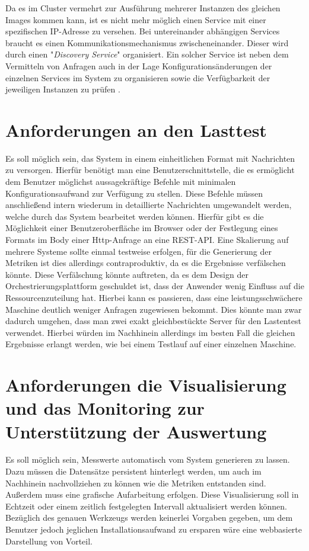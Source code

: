 Da es im Cluster vermehrt zur Ausführung mehrerer Instanzen des gleichen Images kommen kann, ist es nicht mehr möglich einen Service mit einer spezifischen IP-Adresse zu versehen. Bei untereinander abhängigen Services braucht es einen Kommunikationsmechanismus zwischeneinander. Dieser wird durch einen "\emph{Discovery Service}" organisiert. Ein solcher Service ist neben dem Vermitteln von Anfragen auch in der Lage Konfigurationsänderungen der einzelnen Services im System zu organisieren sowie die Verfügbarkeit der jeweiligen Instanzen zu prüfen \cite[Seite~45 ff.]{soppelsaswarm}.

\section{Anforderungen an den Lasttest}
Es soll möglich sein, das System in einem einheitlichen Format mit Nachrichten zu versorgen. Hierfür benötigt man eine Benutzerschnittstelle, die es ermöglicht dem Benutzer möglichst aussagekräftige Befehle mit minimalen Konfigurationsaufwand zur Verfügung zu stellen. Diese Befehle müssen anschließend intern wiederum in detaillierte Nachrichten umgewandelt werden, welche durch das System bearbeitet werden können. Hierfür gibt es die Möglichkeit einer Benutzeroberfläche im Browser oder der Festlegung eines Formats im Body einer Http-Anfrage an eine REST-API. Eine Skalierung auf mehrere Systeme sollte einmal testweise erfolgen, für die Generierung der Metriken ist dies allerdings contraproduktiv, da es die Ergebnisse verfälschen könnte. Diese Verfälschung könnte auftreten, da es dem Design der Orchestrierungsplattform geschuldet ist, dass der Anwender wenig Einfluss auf die Ressourcenzuteilung hat. Hierbei kann es passieren, dass eine leistungsschwächere Maschine deutlich weniger Anfragen zugewiesen bekommt. Dies könnte man zwar dadurch umgehen, dass man zwei exakt gleichbestückte Server für den Lastentest verwendet. Hierbei würden im Nachhinein allerdings im besten Fall die gleichen Ergebnisse erlangt werden, wie bei einem Testlauf auf einer einzelnen Maschine.

\section{Anforderungen die Visualisierung und das Monitoring zur Unterstützung der Auswertung}
Es soll möglich sein, Messwerte automatisch vom System generieren zu lassen. Dazu müssen die Datensätze persistent hinterlegt werden, um auch im Nachhinein nachvollziehen zu können wie die Metriken entstanden sind. Außerdem muss eine grafische Aufarbeitung erfolgen. Diese Visualisierung soll in Echtzeit oder einem zeitlich festgelegten Intervall aktualisiert werden können. Bezüglich des genauen Werkzeugs werden keinerlei Vorgaben gegeben, um dem Benutzer jedoch jeglichen Installationsaufwand zu ersparen wäre eine webbasierte Darstellung von Vorteil.



